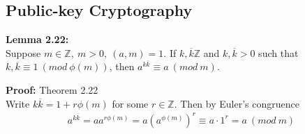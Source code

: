 \documentclass[a4paper]{article}
\begin{document}
\subsection{Public-key Cryptography}

\textbf{Lemma 2.22:}\\
Suppose $m\in\mathbb{Z},\ m>0,\ (a,m)=1$. If $k,\overline{k}\mathbb{Z}$ and
$k,\overline{k}>0$ such that $k,\overline{k}\equiv1\ (mod\ \phi(m))$, then
$a^{k\overline{k}}\equiv a\ (mod\ m)$.

\textbf{Proof:} Theorem 2.22\\
Write $k\overline{k}=1+r\phi(m)$ for some $r\in\mathbb{Z}$. Then by Euler's congruence
\begin{align*}
    a^{k\overline{k}} = aa^{r\phi(m)} = a(a^{\phi(m)})^r \equiv a\cdot1^r = a\ (mod\ m)
\end{align*}
\end{document}
